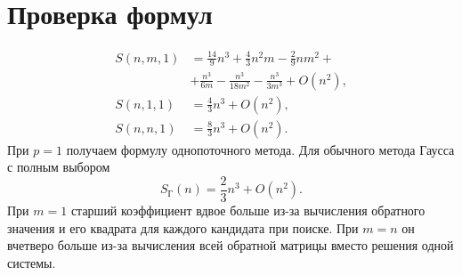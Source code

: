\documentclass[a4paper,12pt]{article}
\begin{document}
\section{Проверка формул}
\begin{align*}
    S(n,m,1) & = \frac{14}{9}n^3 + \frac{4}{3}n^2m - \frac{2}{9}nm^2 + \\
    & + \frac{n^3}{6m} - \frac{n^3}{18m^2} - \frac{n^3}{3m^3} + O(n^2), \\
    S(n,1,1) & = \frac{4}{3}n^3 + O(n^2), \\
    S(n,n,1) & = \frac{8}{3}n^3 + O(n^2).
\end{align*}
При $p = 1$ получаем формулу однопоточного метода. Для обычного метода Гаусса с полным выбором
\[
    S_{\text{Г}}(n) = \frac{2}{3}n^3 + O(n^2).
\]
При $m = 1$ старший коэффициент вдвое больше из-за вычисления обратного значения и его квадрата для каждого кандидата при поиске. При $m = n$ он вчетверо больше из-за вычисления всей обратной матрицы вместо решения одной системы.
\end{document}

